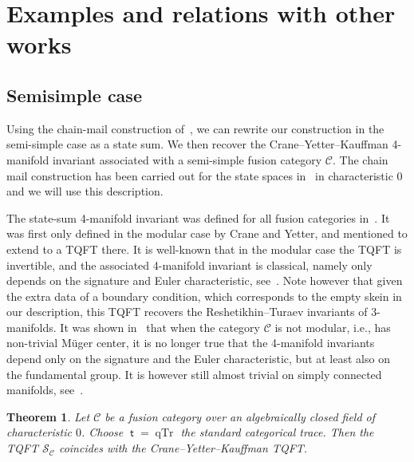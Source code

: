 \documentclass[10pt,a4paper]{amsart}
\newtheorem{theorem}{Theorem}
\numberwithin{equation}{section}
\numberwithin{theorem}{section}
\numberwithin{proposition}{section}
\numberwithin{definition}{section}
\numberwithin{lemma}{section}
\numberwithin{corollary}{section}
\numberwithin{remark}{section}
\numberwithin{example}{section}
\newcommand{\cat}{\mathcal{C}}
\newcommand{\mt}{{\operatorname{\mathsf{t}}}}
\newcommand{\TSkein}{{\mathscr{S}}}
\begin{document}
\section{Examples and relations with other works}\label{S:Examples}
\subsection{Semisimple case}\label{SS:ExSS} Using the chain-mail construction of~\cite{Roberts}, we can rewrite our construction in the semi-simple case as a state sum. We then recover the Crane--Yetter--Kauffman 4-manifold invariant associated with a semi-simple fusion category $\cat$. The chain mail construction has been carried out for the state spaces in~\cite{Tham21} in characteristic 0 and we will use this description.

The state-sum 4-manifold invariant was defined for all fusion categories in~\cite{CYK}. It was first only defined in the modular case by Crane and Yetter, and mentioned to extend to a TQFT there. It is well-known that in the modular case the TQFT is invertible, and the associated 4-manifold invariant is classical, namely only depends on the signature and Euler characteristic, see~\cite[Proposition 6.2]{CYK}. Note however that given the extra data of a boundary condition, which corresponds to the empty skein in our description, this TQFT recovers the Reshetikhin--Turaev invariants of 3-manifolds. It was shown in~\cite{BB18} that when the category $\cat$ is not modular, i.e., has non-trivial M\"uger center, it is no longer true that the 4-manifold invariants depend only on the signature and the Euler characteristic, but at least also on the fundamental group. It is however still almost trivial on simply connected manifolds, see~\cite{BB18}.
\begin{theorem} Let $\cat$ be a fusion category over an algebraically closed field of characteristic $0$. Choose $\mt=\operatorname{qTr}$ the standard categorical trace. Then the TQFT $\TSkein_\cat$ coincides with the Crane--Yetter--Kauffman TQFT.
\end{theorem}
\end{document}
